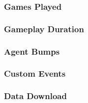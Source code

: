 \subsubsection{Games Played}
\subsubsection{Gameplay Duration}
\subsubsection{Agent Bumps}
\subsubsection{Custom Events}
\subsubsection{Data Download}










	




















